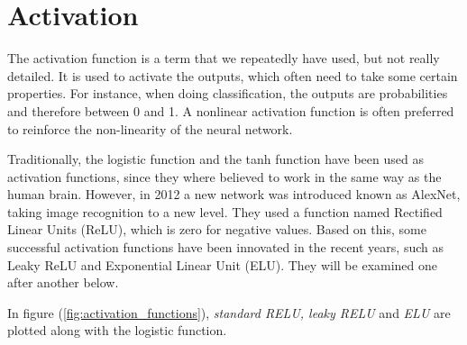 \section{Activation} \label{sec:activation}
The activation function is a term that we repeatedly have used, but not really detailed. It is used to activate the outputs, which often need to take some certain properties. For instance, when doing classification, the outputs are probabilities and therefore between 0 and 1. A nonlinear activation function is often preferred to reinforce the non-linearity of the neural network. 

Traditionally, the logistic function and the tanh function have been used as activation functions, since they where believed to work in the same way as the human brain. However, in 2012 a new network was introduced known as AlexNet, taking image recognition to a new level. They used a function named Rectified Linear Units (ReLU), which is zero for negative values. Based on this, some successful activation functions have been innovated in the recent years, such as Leaky ReLU and Exponential Linear Unit (ELU). They will be examined one after another below. 



\iffalse
In figure (\ref{fig:activation_functions}), \textit{standard RELU, leaky RELU} and \textit{ELU} are plotted along with the logistic function.

